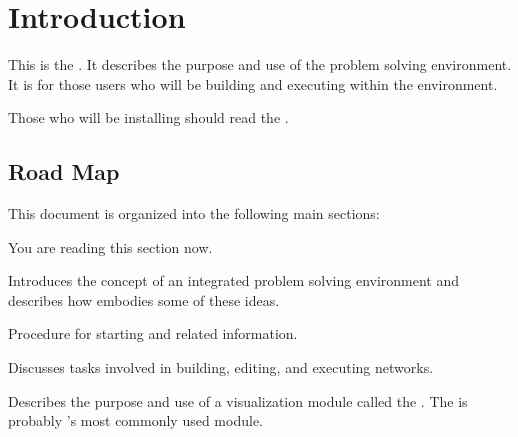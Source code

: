 %

\section{Introduction}
\label{sec:intro}


This is the \etitle{\srug}.  It describes the purpose and use of the \sr{}
problem solving environment.  It is for those users who will be building
and executing  within the \sr{} environment.

Those who will be installing \sr{} should read the
\htmladdnormallinkfoot{\srig{}}{\installguideurl}.




\subsection{Road Map}
\label{sec:roadmap}

This document is organized into the following main sections:

\begin{description}
\item {} You are reading this section now.
\item {} Introduces the concept of an
  integrated problem solving environment  and describes how \SR{}
  embodies some of these ideas.
\item {}  Procedure for starting \sr{}
  and related information.
\item {} Discusses tasks involved in
  building, editing, and executing networks.
\item {} Describes the
  purpose and use of a visualization module called the \viewer{}.  The
  \viewer{} is probably \sr{}'s most commonly used module.
\end{description}

